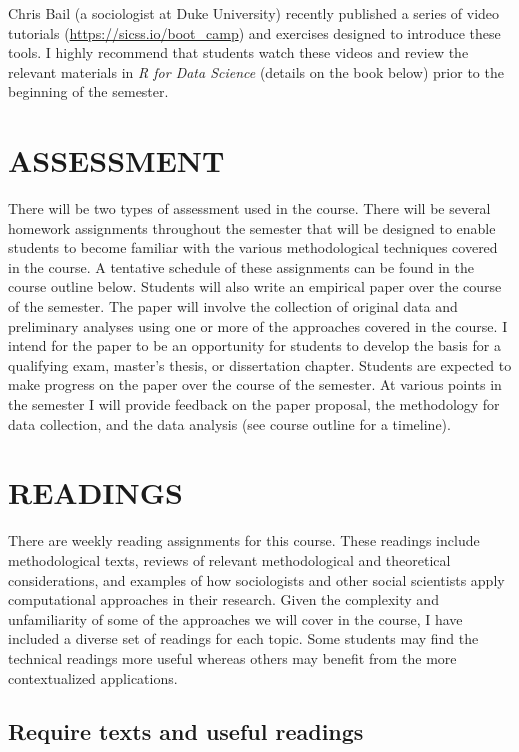 \documentclass[
  10pt,
]{article}
\begin{document}
Chris Bail (a sociologist at Duke University) recently published a
series of video tutorials (\url{https://sicss.io/boot_camp}) and
exercises designed to introduce these tools. I highly recommend that
students watch these videos and review the relevant materials in \emph{R
for Data Science} (details on the book below) prior to the beginning of
the semester.

\hypertarget{assessment}{%
\section{ASSESSMENT}\label{assessment}}

There will be two types of assessment used in the course. There will be
several homework assignments throughout the semester that will be
designed to enable students to become familiar with the various
methodological techniques covered in the course. A tentative schedule of
these assignments can be found in the course outline below. Students
will also write an empirical paper over the course of the semester. The
paper will involve the collection of original data and preliminary
analyses using one or more of the approaches covered in the course. I
intend for the paper to be an opportunity for students to develop the
basis for a qualifying exam, master's thesis, or dissertation chapter.
Students are expected to make progress on the paper over the course of
the semester. At various points in the semester I will provide feedback
on the paper proposal, the methodology for data collection, and the data
analysis (see course outline for a timeline).

\hypertarget{readings}{%
\section{READINGS}\label{readings}}

There are weekly reading assignments for this course. These readings
include methodological texts, reviews of relevant methodological and
theoretical considerations, and examples of how sociologists and other
social scientists apply computational approaches in their research.
Given the complexity and unfamiliarity of some of the approaches we will
cover in the course, I have included a diverse set of readings for each
topic. Some students may find the technical readings more useful whereas
others may benefit from the more contextualized applications.

\hypertarget{require-texts-and-useful-readings}{%
\subsection{Require texts and useful
readings}\label{require-texts-and-useful-readings}}
\end{document}
